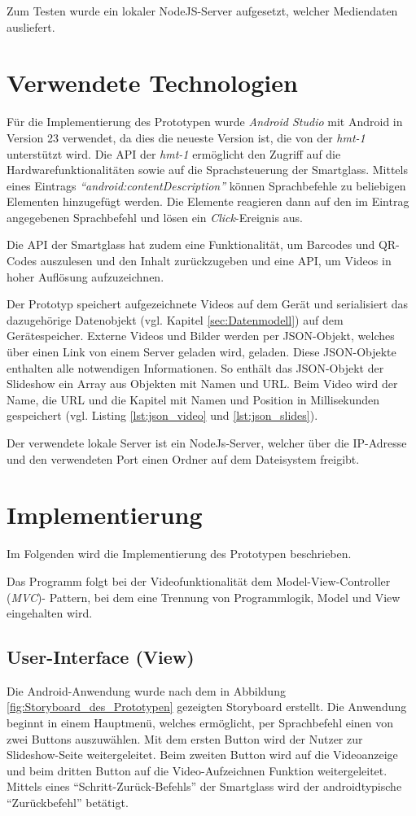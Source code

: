 Zum Testen wurde ein lokaler NodeJS-Server aufgesetzt, welcher Mediendaten ausliefert.
%
%
%
%
%
%
\section{Verwendete Technologien}
\label{sec:Verwendete_Technologien}
Für die Implementierung des Prototypen wurde \emph{Android Studio} mit Android in Version 23 verwendet, da dies die neueste Version ist, die von der \emph{hmt-1} unterstützt wird. Die API der \emph{hmt-1} ermöglicht den Zugriff auf die Hardwarefunktionalitäten sowie auf die Sprachsteuerung der Smartglass. Mittels eines Eintrags \emph{\enquote{android:contentDescription}} können Sprachbefehle zu beliebigen Elementen hinzugefügt werden. Die Elemente reagieren dann auf den im Eintrag angegebenen Sprachbefehl und lösen ein \emph{Click}-Ereignis aus.

Die API der Smartglass hat zudem eine Funktionalität, um Barcodes und QR-Codes auszulesen und den Inhalt zurückzugeben und eine API, um Videos in hoher Auflösung aufzuzeichnen. 

Der Prototyp speichert aufgezeichnete Videos auf dem Gerät und serialisiert das dazugehörige Datenobjekt (vgl. Kapitel \ref{sec:Datenmodell}) auf dem Gerätespeicher. Externe Videos und Bilder werden per JSON-Objekt, welches über einen Link von einem Server geladen wird, geladen. Diese JSON-Objekte enthalten alle notwendigen Informationen. So enthält das JSON-Objekt der Slideshow ein Array aus Objekten mit Namen und URL. Beim Video wird der Name, die URL und die Kapitel mit Namen und Position in Millisekunden gespeichert (vgl. Listing \ref{lst:json_video} und \ref{lst:json_slides}).

Der verwendete lokale Server ist ein NodeJs-Server, welcher über die IP-Adresse und den verwendeten Port einen Ordner auf dem Dateisystem freigibt.
%
%
%
%
%
%
\section{Implementierung}
\label{sec:Implementation}
Im Folgenden wird die Implementierung des Prototypen beschrieben. 

Das Programm folgt bei der Videofunktionalität dem Model-View-Controller (\emph{MVC})- Pattern, bei dem eine Trennung von Programmlogik, Model und View eingehalten wird.
%
%
%
%
%
%
\subsection{User-Interface (View)}
Die Android-Anwendung wurde nach dem in Abbildung \ref{fig:Storyboard_des_Prototypen} gezeigten Storyboard erstellt. Die Anwendung beginnt in einem Hauptmenü, welches ermöglicht, per Sprachbefehl einen von zwei Buttons auszuwählen. Mit dem ersten Button wird der Nutzer zur Slideshow-Seite weitergeleitet. Beim zweiten Button wird auf die Videoanzeige und beim dritten Button auf die Video-Aufzeichnen Funktion weitergeleitet. Mittels eines \enquote{Schritt-Zurück-Befehls} der Smartglass wird der androidtypische \enquote{Zurückbefehl} betätigt.

